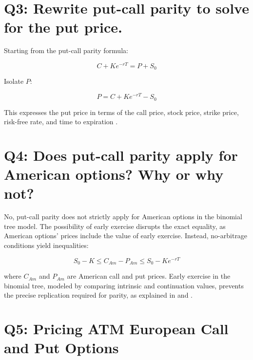\documentclass{article}
\begin{document}
\section*{Q3: Rewrite put-call parity to solve for the put price.}

Starting from the put-call parity formula:

\begin{equation}
C + Ke^{-rT} = P + S_0
\end{equation}

Isolate $P$:

\begin{equation}
P = C + Ke^{-rT} - S_0
\end{equation}

This expresses the put price in terms of the call price, stock price, strike price, risk-free rate, and time to expiration \citep{hull2018options}.

\section*{Q4: Does put-call parity apply for American options? Why or why not?}

No, put-call parity does not strictly apply for American options in the binomial tree model. The possibility of early exercise disrupts the exact equality, as American options’ prices include the value of early exercise. Instead, no-arbitrage conditions yield inequalities:

\begin{equation}
S_0 - K \leq C_{Am} - P_{Am} \leq S_0 - Ke^{-rT}
\end{equation}

where $C_{Am}$ and $P_{Am}$ are American call and put prices. Early exercise in the binomial tree, modeled by comparing intrinsic and continuation values, prevents the precise replication required for parity, as explained in \citet{hull2018options} and \citet{shreve2004stochastic}.



\section*{Q5: Pricing ATM European Call and Put Options}
\end{document}
